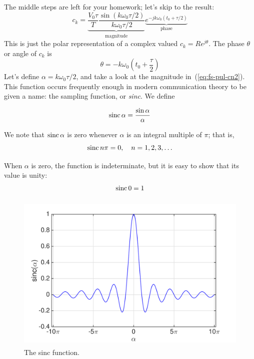 The middle steps are left for your homework; let's skip to the result:
\begin{equation}
c_k=
  \underbrace{\frac{V_0\tau}{T}
     \frac{\sin(k\omega_0\tau/2)}{k\omega_0\tau/2}}_{\mathrm{magnitude}}
  \underbrace{e^{-jk\omega_0(t_0+\tau/2)}}_{\mathrm{phase}}
\label{eq:fs-pul-cn2}
\end{equation}
This is just the polar representation of a complex valued $c_k = R
e^{j\theta}$.  The phase $\theta$ or angle of $c_k$ is
\begin{equation}
\theta=-k\omega_0 \left(t_0+\frac{\tau}{2}\right)
\end{equation}
Let's define $\alpha=k\omega_0 \tau/2$, and take a look at the
magnitude in~(\ref{eq:fs-pul-cn2}). This function occurs frequently
enough in modern communication theory to be given a name: the sampling
function, or \emph{sinc}. We define

\begin{equation}
\operatorname{sinc}\alpha = \frac{\sin\alpha}{\alpha}
\end{equation}

We note that $\operatorname{sinc}\alpha$ is zero whenever $\alpha$ is an integral
multiple of $\pi$; that is,
\begin{equation}
\operatorname{sinc} n\pi = 0, \quad n=1, 2, 3, \ldots
\label{eq:fs-Snpi}
\end{equation}

When $\alpha$ is zero, the function is indeterminate, but it is easy
to show that its value is unity: 
\begin{equation}
\operatorname{sinc} 0 = 1
\label{eq:fs-S0}
\end{equation}

\begin{figure}
\centerline{\includegraphics[height=3in]{ch-physical/fs_sinc}}
\caption{The sinc function.\label{fig:sinc}}
\end{figure}

